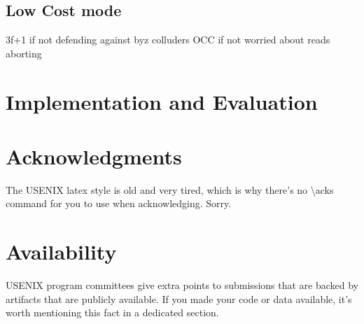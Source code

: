 \subsection{Low Cost mode}
3f+1 if not defending against byz colluders
OCC if not worried about reads aborting


\section{Implementation and Evaluation}








\section*{Acknowledgments}

The USENIX latex style is old and very tired, which is why
there's no \textbackslash{}acks command for you to use when
acknowledging. Sorry.

\section*{Availability}

USENIX program committees give extra points to submissions that are
backed by artifacts that are publicly available. If you made your code
or data available, it's worth mentioning this fact in a dedicated
section.







